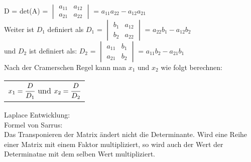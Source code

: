 \documentclass[a4paper,10pt]{scrartcl}
\begin{document}
        D = det(A) = 
        $\begin{vmatrix}
            a_{11} & a_{12} \\
            a_{21} & a_{22}
        \end{vmatrix}$
        = $a_{11}a_{22} - a_{12}a_{21}$ \\
        Weiter ist $D_1$ definiert als $D_1$ = 
        $\begin{vmatrix}
            b_{1} & a_{12} \\
            b_{2} & a_{22}
        \end{vmatrix}$
        = $a_{22}b_1 - a_{12}b_2$ \\
        und $D_2$ ist definiert als: $D_2$ = 
        $\begin{vmatrix}
            a_{11} & b_{1} \\
            a_{21} & b_{2}
        \end{vmatrix}$
        = $a_{11}b_2 - a_{21}b_1$ \\
        Nach der Cramerschen Regel kann man $x_1$ und $x_2$ wie folgt berechnen: \\
        \begin{tabular}{c}
            $x_1 = \cfrac{D}{D_1}$ und $x_2 = \cfrac{D}{D_2}$
        \end{tabular}
        Laplace Entwicklung: \\
        Formel von Sarrus: \\
        Das Transponieren der Matrix ändert nicht die Determinante. Wird eine Reihe einer Matrix mit einem Faktor multipliziert, so wird auch der Wert der Determinatne mit dem selben 
        Wert multipliziert. 
        \newpage
\end{document}
